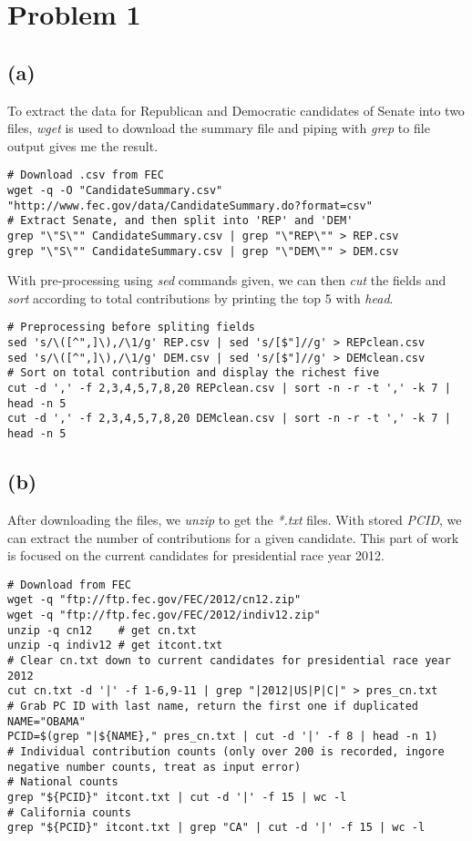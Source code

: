 \documentclass{article}
\begin{document}
\section*{Problem 1}
\subsection*{(a)}

To extract the data for Republican and Democratic candidates of Senate into two files,
\textit{wget} is used to download the summary file and piping with \textit{grep} to file output gives me the result.

\begin{lstlisting}
# Download .csv from FEC
wget -q -O "CandidateSummary.csv" "http://www.fec.gov/data/CandidateSummary.do?format=csv"
# Extract Senate, and then split into 'REP' and 'DEM'
grep "\"S\"" CandidateSummary.csv | grep "\"REP\"" > REP.csv
grep "\"S\"" CandidateSummary.csv | grep "\"DEM\"" > DEM.csv
\end{lstlisting}

With pre-processing using \textit{sed} commands given, we can then \textit{cut} the fields and
\textit{sort} according to total contributions by printing the top 5 with \textit{head}.

\begin{lstlisting}
# Preprocessing before spliting fields
sed 's/\([^",]\),/\1/g' REP.csv | sed 's/[$"]//g' > REPclean.csv
sed 's/\([^",]\),/\1/g' DEM.csv | sed 's/[$"]//g' > DEMclean.csv
# Sort on total contribution and display the richest five
cut -d ',' -f 2,3,4,5,7,8,20 REPclean.csv | sort -n -r -t ',' -k 7 | head -n 5
cut -d ',' -f 2,3,4,5,7,8,20 DEMclean.csv | sort -n -r -t ',' -k 7 | head -n 5
\end{lstlisting}

\subsection*{(b)}

After downloading the files, we \textit{unzip} to get the \textit{*.txt} files. With stored \textit{PCID},
we can extract the number of contributions for a given candidate. This part of work is focused on the current
candidates for presidential race year 2012.

\begin{lstlisting}
# Download from FEC
wget -q "ftp://ftp.fec.gov/FEC/2012/cn12.zip"
wget -q "ftp://ftp.fec.gov/FEC/2012/indiv12.zip"
unzip -q cn12    # get cn.txt
unzip -q indiv12 # get itcont.txt
# Clear cn.txt down to current candidates for presidential race year 2012
cut cn.txt -d '|' -f 1-6,9-11 | grep "|2012|US|P|C|" > pres_cn.txt
# Grab PC ID with last name, return the first one if duplicated
NAME="OBAMA"
PCID=$(grep "|${NAME}," pres_cn.txt | cut -d '|' -f 8 | head -n 1)
# Individual contribution counts (only over 200 is recorded, ingore negative number counts, treat as input error)
# National counts
grep "${PCID}" itcont.txt | cut -d '|' -f 15 | wc -l
# California counts
grep "${PCID}" itcont.txt | grep "CA" | cut -d '|' -f 15 | wc -l
\end{lstlisting}
\end{document}
